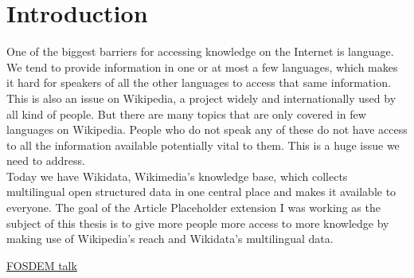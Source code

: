 \section{Introduction}
One of the biggest barriers for accessing knowledge on the Internet is language. We tend to provide information in one or at most a few languages, which makes it hard for speakers of all the other languages to access that same information. This is also an issue on Wikipedia, a project widely and internationally used by all kind of people. But there are many topics that are only covered in few languages on Wikipedia. People who do not speak any of these do not have access to all the information available potentially vital to them. This is a huge issue we need to address. \\

Today we have Wikidata, Wikimedia’s knowledge base, which collects multilingual open structured data in one central place and makes it available to everyone. 
The goal of the Article Placeholder extension I was working as the subject of this thesis is to give more people more access to more knowledge by making use of Wikipedia’s reach and Wikidata’s multilingual data.


\href{https://www.fosdem.org/2016/schedule/event/increasing_access_to_free_and_open_knowledge_for_speakers_of_underserved_languages_on_wikipedia/}{FOSDEM talk}
